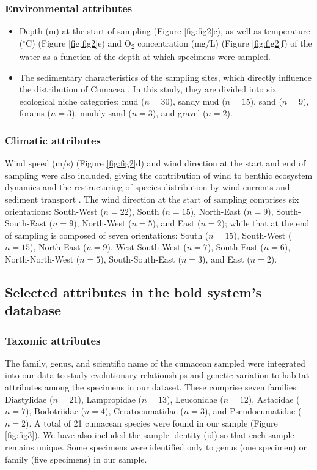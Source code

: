 \subsubsection{Environmental attributes} 
\begin{itemize}
\item Depth (m) at the start of sampling (Figure \ref{fig:fig2}c), as well as temperature ($^\circ$C) (Figure \ref{fig:fig2}e) and O\textsubscript{2} concentration (mg/L) (Figure \ref{fig:fig2}f) of the water as a function of the depth at which specimens were sampled. 
\item The sedimentary characteristics of the sampling sites, which directly influence the distribution of Cumacea \citep{uhlir_adding_2021}. In this study, they are divided into six ecological niche categories: mud ($n=30$), sandy mud ($n=15$), sand ($n=9$), forams ($n=3$), muddy sand ($n=3$), and gravel ($n=2$).
\end{itemize}

\subsubsection{Climatic attributes} 
Wind speed (m/s) (Figure \ref{fig:fig2}d) and wind direction at the start and end of sampling were also included, giving the contribution of wind to benthic ecosystem dynamics and the restructuring of species distribution by wind currents and sediment transport \citep{siedlecki2016experiments, waga_recent_2020,saeedi_environmental_2022}. The wind direction at the start of sampling comprises six orientations: South-West ($n=22$), South ($n=15$), North-East ($n=9$), South-South-East ($n=9$), North-West ($n=5$), and East ($n=2$); while that at the end of sampling is composed of seven orientations: South ($n=15$), South-West ($n=15$), North-East ($n=9$), West-South-West ($n=7$), South-East ($n=6$), North-North-West ($n=5$), South-South-East ($n=3$), and East ($n=2$). 

\subsection{Selected attributes in the bold system's database}
\subsubsection{Taxomic attributes} 
The family, genus, and scientific name of the cumacean sampled were integrated into our data to study evolutionary relationships and genetic variation to habitat attributes among the specimens in our dataset. These comprise seven families: Diastylidae ($n=21$), Lampropidae ($n=13$), Leuconidae ($n=12$), Astacidae ($n=7$), Bodotriidae ($n=4$), Ceratocumatidae ($n=3$), and Pseudocumatidae ($n=2$). A total of 21 cumacean species were found in our sample (Figure \ref{fig:fig3}). We have also included the sample identity (id) so that each sample remains unique. Some specimens were identified only to genus (one specimen) or family (five specimens) in our sample.

